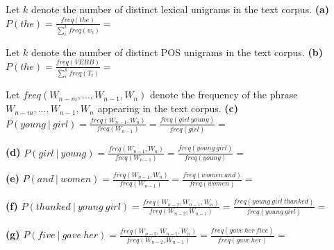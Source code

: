 \documentclass[11pt]{article}
\renewcommand\part[1]{\vspace{.10in}\textbf{(#1)}}
\begin{document}
Let $k$ denote the number of distinct lexical unigrams in the text corpus. \newline
\part{a} $P(the) = \frac{freq(the)}{\sum\limits_{i}^{k} freq(w_i)} = \ $ 

Let $k$ denote the number of distinct POS unigrams in the text corpus. \newline
\part{b} $P(the) = \frac{freq(VERB)}{\sum\limits_{i}^{k} freq(T_i)} = \ $

Let $freq(W_{n-m},...,W_{n-1}, W_{n})$ denote the frequency of the phrase $W_{n-m},...,W_{n-1}, W_{n}$ appearing in the text corpus. \newline
\part{c} $P(young \ | \ girl) = \frac{freq(W_{n-1}, W_n)}{freq(W_{n-1})} = \frac{freq(girl \ young)}{freq(girl)} = \ $

\part{d} $P(girl \ | \ young) = \frac{freq(W_{n-1}, W_n)}{freq(W_{n-1})} = \frac{freq(young \ girl)}{freq(young)} = \ $

\part{e} $P(and \ | \ women) = \frac{freq(W_{n-1}, W_n)}{freq(W_{n-1})} = \frac{freq(women \ and)}{freq(women)} = \ $

\part{f} $P(thanked \ | \ young \ girl) = \frac{freq(W_{n-2}, W_{n-1}, W_n)}{freq(W_{n-2}, W_{n-1})} = \frac{freq(young \ girl \ thanked)}{freq(young \ girl)} = \ $

\part{g} $P(five \ | \ gave \ her) = \frac{freq(W_{n-2}, W_{n-1}, W_n)}{freq(W_{n-2}, W_{n-1})} = \frac{freq(gave \ her \ five)}{freq(gave \ her)} = \ $
\end{document}
